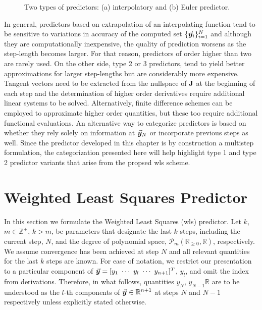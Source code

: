 \begin{figure*}[t]
	\centering
	\qquad
	\caption{Two types of predictors: (a) interpolatory and (b) Euler
		predictor.}%
	\label{fig:FIG42}%
\end{figure*}

In general, predictors based on extrapolation of an
interpolating function tend to be sensitive to variations in accuracy of the 
computed set
$\{\vec{\bm{y}}_i\}_{i=1}^N$ and although they are computationally inexpensive, the 
quality of prediction worsens as the 
step-length becomes
larger. For that reason, predictors of order higher than two are rarely
used\cite{Seydel87,Salgovic81}. On the other side, type 2 or 3
predictors\cite{Schwetlick87,Gervais04,Syam02,Syam03,Watson87,Deuflhard87,Lundberg93},
 tend to yield better approximations for larger step-lengths but are 
considerably more expensive. Tangent vectors need to be
extracted from the nullspace of $\mathbf{J}$ at the beginning of each step and
the determination of higher order derivatives require additional linear systems
to be solved. Alternatively, finite difference schemes can be employed to
approximate higher order quantities, but these too require additional functional
evaluations. An alternative way to categorize predictors is based on whether
they rely solely on information at $\vec{\bm{y}}_N$ or incorporate previous steps as
well\cite{Allgower91}. Since the predictor developed in this chapter is by 
construction a multistep formulation, the categorization
presented here will help highlight type 1 and type 2 predictor variants that
arise from the propsed \acrshort{wls} scheme.



\section{Weighted Least Squares Predictor}\label{CH5-S2}

In this section we formulate the Weighted Least Squares (\acrshort{wls}) 
predictor. Let $k$, $m\in\mathbb{Z}^+$, $k>m$, be parameters that designate the 
last $k$ 
steps, including the current step, $N$, and the degree of polynomial space,
$\mathcal{P}_m(\mathbb{R}_{\geq0},\mathbb{R})$,
respectively.
We assume convergence has been achieved at step $N$ and all
relevant quantities for the last $k$ steps are known. 
 For ease of notation, we restrict our presentation to a particular
component of $\bvec{y}=[ y_1\ \cdots\ y_l\ \cdots\  y_{n+1}]^T$, $y_l$, and 
omit 
the index from derivations.  Therefore, in what follows, quantities
$y_N$, $y_{N-1}\mathbb{R}$
are to be understood as the $l$-th components of $\vec{\bm{y}}\in\mathbb{R}^{n+1}$ 
at steps $N$ and $N-1$ respectively unless explicitly stated otherwise. 


